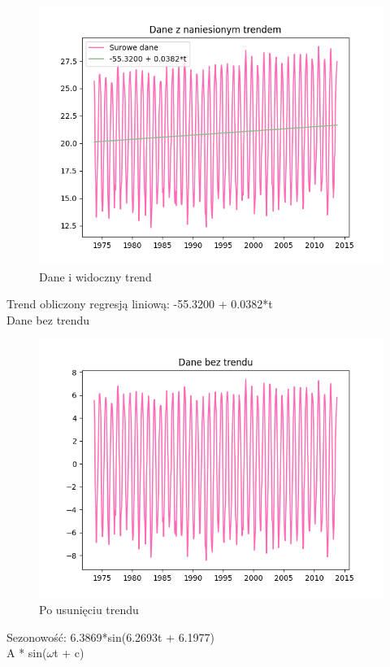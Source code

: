 \documentclass[12pt]{article}
\begin{document}
\begin{figure}[!htbp]
    \centering
    \includegraphics[scale=0.70]{daneItrend.png}
    \caption{Dane i widoczny trend}
    \label{fig:enter-label}
\end{figure}
Trend obliczony regresją liniową: -55.3200 + 0.0382*t \\
Dane bez trendu
\begin{figure}[!htbp]
    \centering
    \includegraphics[scale=0.70]{dane_bez_trendu.png}
    \caption{Po usunięciu trendu}
    \label{fig:enter-label}
\end{figure}
Sezonowość: 6.3869*sin(6.2693t + 6.1977) \\
A * sin($\omega$t + c) \\
\end{document}
